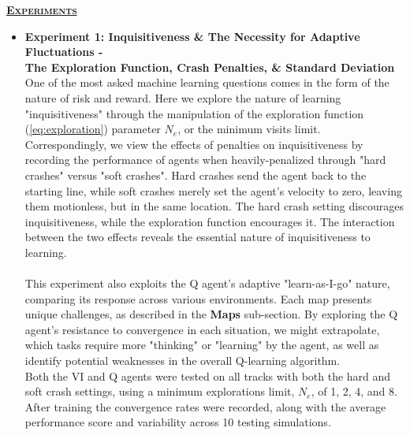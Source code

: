 \documentclass[12pt, letter]{article}
\newlength{\remaining}
\newcommand{\titleline}[1]{%
\setlength{\remaining}{\textwidth-\widthof{\textsc{#1}}}
\noindent\underline{\textsc{\textbf{#1}}\hspace*{\remaining}}\par}
\begin{document}
\clearpage
\titleline{Experiments}
\begin{itemize}
    \item \textbf{Experiment 1: Inquisitiveness \& The Necessity for Adaptive Fluctuations - \\The Exploration Function, Crash Penalties, \& Standard Deviation}\\
    One of the most asked machine learning questions comes in the form of the nature of risk and reward.  Here we explore the nature of learning "inquisitiveness" through the manipulation of the exploration function (\ref{eq:exploration}) parameter $N_e$, or the minimum visits limit.  Correspondingly, we view the effects of penalties on inquisitiveness by recording the performance of agents when heavily-penalized through "hard crashes" versus "soft crashes".  Hard crashes send the agent back to the starting line, while soft crashes merely set the agent's velocity to zero, leaving them motionless, but in the same location.  The hard crash setting discourages inquisitiveness, while the exploration function encourages it.  The interaction between the two effects reveals the essential nature of inquisitiveness to learning.\\
    \\
    This experiment also exploits the Q agent's adaptive "learn-as-I-go" nature, comparing its response across various environments.  Each map presents unique challenges, as described in the \textbf{Maps} sub-section.  By exploring the Q agent's resistance to convergence in each situation, we might extrapolate, which tasks require more "thinking" or "learning" by the agent, as well as identify potential weaknesses in the overall Q-learning algorithm.
    \\
    Both the VI and Q agents were tested on all tracks with both the hard and soft crash settings, using a minimum explorations limit, $N_e$, of 1, 2, 4, and 8.  After training the convergence rates were recorded, along with the average performance score and variability across 10 testing simulations.
    

\end{itemize}
\end{document}
